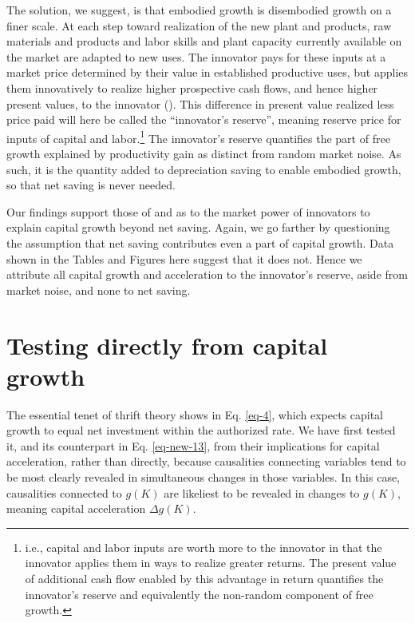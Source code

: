 The solution, we suggest, is that embodied growth is disembodied growth
on a finer scale. At each step toward realization of the new plant and
products, raw materials and products and labor skills and plant capacity
currently available on the market are adapted to new uses. The innovator
pays for these inputs at a market price determined by their value in
established productive uses, but applies them innovatively to realize
higher prospective cash flows, and hence higher present values, to the
innovator
(\citet{marshallPrinciplesEconomics1890, schumpeterTheoryEconomicDevelopment1934}).
This difference in present value realized less price paid will here be
called the ``innovator's reserve'', meaning reserve price for inputs of
capital and labor.\footnote{i.e., capital and labor inputs are worth
  more to the innovator in that the innovator applies them in ways to
  realize greater returns. The present value of additional cash flow
  enabled by this advantage in return quantifies the innovator's reserve
  and equivalently the non-random component of free growth.} The innovator's reserve quantifies the
part of free growth explained by productivity gain as distinct from
random market noise. As such, it is the quantity added to depreciation
saving to enable embodied growth, so that net saving is never
needed.

Our findings support those of \cite{picketyCapitalIsBack2014} and \cite{kurz2023market} as to the market power of innovators to explain capital growth beyond net saving. Again, we go farther by questioning the assumption that net saving contributes even a part of capital growth. Data shown in the Tables and Figures here suggest that it does not. Hence we attribute all capital growth and acceleration to the innovator's reserve, aside from market noise, and none to net saving.

\section{Testing directly from capital growth}

The essential tenet of thrift theory shows in Eq. \eqref{eq-4}, which expects capital growth to equal net investment within the authorized rate. We have first tested it, and its counterpart in Eq. \eqref{eq-new-13}, from their implications for capital acceleration, rather than directly, because causalities connecting variables tend to be most clearly revealed in simultaneous changes in those variables. In this case, causalities connected to \(g(K)\) are likeliest to be revealed in changes to \(g(K)\), meaning capital acceleration \(\Delta g(K)\).

